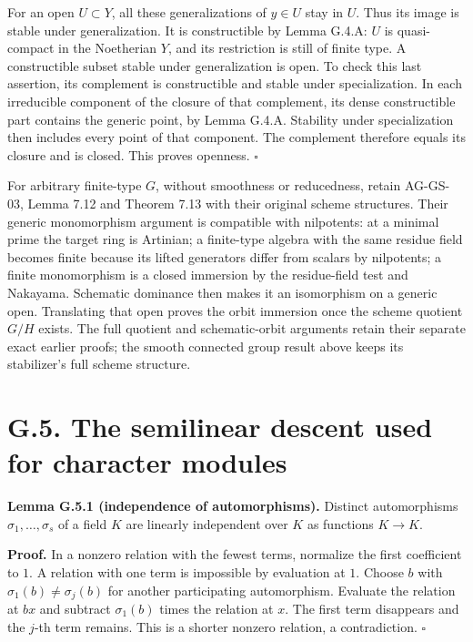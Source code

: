 \documentclass[11pt,a4paper,openany]{report}
\begin{document}
For an open \(U\subset Y\), all these generalizations of \(y\in U\) stay in \(U\). Thus its image is stable under generalization. It is constructible by Lemma G.4.A: \(U\) is quasi-compact in the Noetherian \(Y\), and its restriction is still of finite type. A constructible subset stable under generalization is open. To check this last assertion, its complement is constructible and stable under specialization. In each irreducible component of the closure of that complement, its dense constructible part contains the generic point, by Lemma G.4.A. Stability under specialization then includes every point of that component. The complement therefore equals its closure and is closed. This proves openness. \(\square\)

For arbitrary finite-type \(G\), without smoothness or reducedness, retain AG-GS-03, Lemma 7.12 and Theorem 7.13 with their original scheme structures. Their generic monomorphism argument is compatible with nilpotents: at a minimal prime the target ring is Artinian; a finite-type algebra with the same residue field becomes finite because its lifted generators differ from scalars by nilpotents; a finite monomorphism is a closed immersion by the residue-field test and Nakayama. Schematic dominance then makes it an isomorphism on a generic open. Translating that open proves the orbit immersion once the scheme quotient \(G/H\) exists. The full quotient and schematic-orbit arguments retain their separate exact earlier proofs; the smooth connected group result above keeps its stabilizer's full scheme structure.

\section{G.5. The semilinear descent used for character modules}\label{AG-RG-S08-g.5.-the-semilinear-descent-used-for-character-modules}

\textbf{Lemma G.5.1 (independence of automorphisms).} Distinct automorphisms \(\sigma_1,\ldots,\sigma_s\) of a field \(K\) are linearly independent over \(K\) as functions \(K\to K\).

\textbf{Proof.} In a nonzero relation with the fewest terms, normalize the first coefficient to \(1\). A relation with one term is impossible by evaluation at \(1\). Choose \(b\) with \(\sigma_1(b)\ne\sigma_j(b)\) for another participating automorphism. Evaluate the relation at \(bx\) and subtract \(\sigma_1(b)\) times the relation at \(x\). The first term disappears and the \(j\)-th term remains. This is a shorter nonzero relation, a contradiction. \(\square\)
\end{document}
